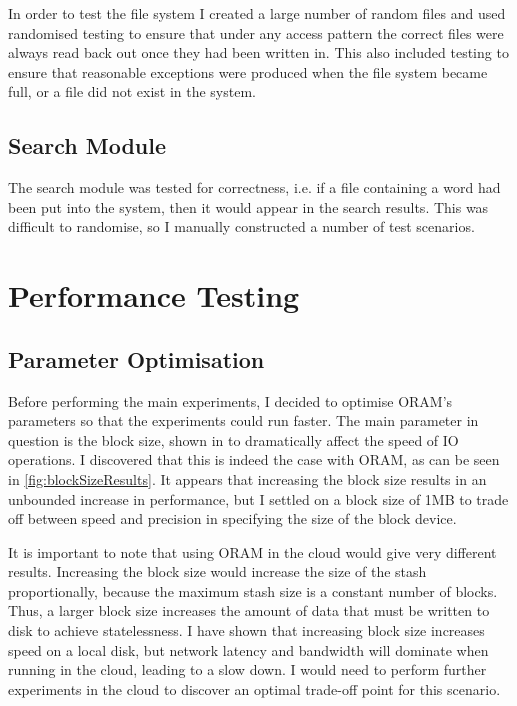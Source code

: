 \documentclass[12pt,a4paper,twoside,openright]{report}
\begin{document}
In order to test the file system I created a large number of random files and used randomised testing to ensure that under any access pattern the correct files were always read back out once they had been written in. This also included testing to ensure that reasonable exceptions were produced when the file system became full, or a file did not exist in the system.

\subsection{Search Module}

The search module was tested for correctness, i.e. if a file containing a word had been put into the system, then it would appear in the search results. This was difficult to randomise, so I manually constructed a number of test scenarios.

\section{Performance Testing}
\label{sec:performanceTesting}

\subsection{Parameter Optimisation}
\label{sub:parameterOptimisation}

Before performing the main experiments, I decided to optimise ORAM's parameters so that the experiments could run faster. The main parameter in question is the block size, shown in \citet{ousterhout1985trace} to dramatically affect the speed of IO operations. I discovered that this is indeed the case with ORAM, as can be seen in \cref{fig:blockSizeResults}. It appears that increasing the block size results in an unbounded increase in performance, but I settled on a block size of 1MB to trade off between speed and precision in specifying the size of the block device.

It is important to note that using ORAM in the cloud would give very different results. Increasing the block size would increase the size of the stash proportionally, because the maximum stash size is a constant number of blocks. Thus, a larger block size increases the amount of data that must be written to disk to achieve statelessness. I have shown that increasing block size increases speed on a local disk, but network latency and bandwidth will dominate when running in the cloud, leading to a slow down. I would need to perform further experiments in the cloud to discover an optimal trade-off point for this scenario.
\end{document}

